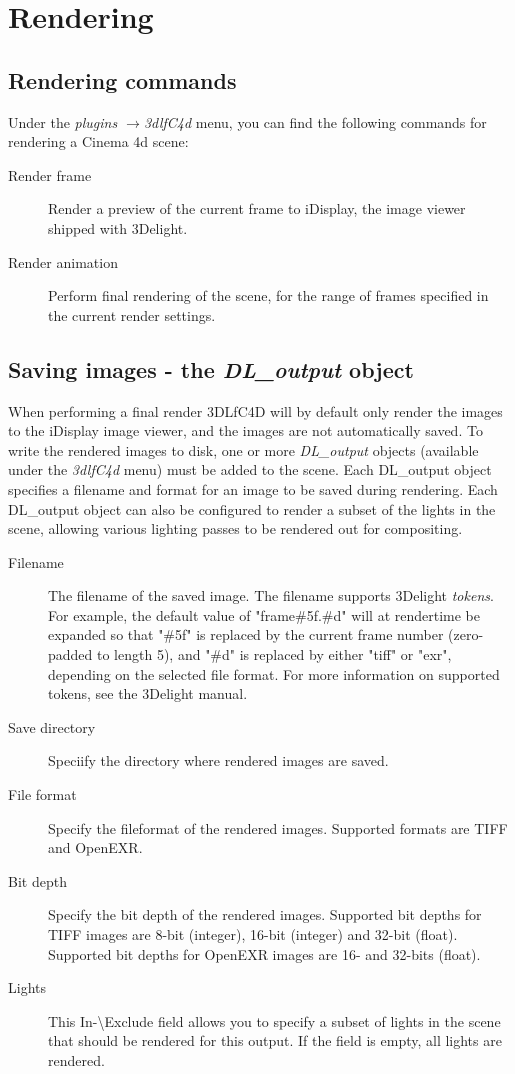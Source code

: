 \documentclass{book}
\begin{document}
\chapter{Rendering}
\section{Rendering commands}
Under the \emph{plugins $\rightarrow$3dlfC4d} menu, you can find the following commands for rendering a Cinema 4d scene:

\begin{description}
\item[Render frame] Render a preview of the current frame to iDisplay, the image viewer shipped with 3Delight. 
\item[Render animation] Perform final rendering of the scene, for the range of frames specified in the current render settings. 
\end{description}

\section{Saving images - the \emph{DL\_output} object}
When performing a final render 3DLfC4D will by default only render the images to the iDisplay image viewer, and the images are not automatically saved. To write the rendered images to disk, one or more \emph{ DL\_output } objects (available under the \emph{3dlfC4d} menu) must be added to the scene. Each DL\_output object specifies a filename and format for an image to be saved during rendering. Each DL\_output object can also be configured to render a subset of the lights in the scene, allowing various lighting passes to be rendered out for compositing. 

\begin{description}
\item[Filename] The filename of the saved image. The filename supports 3Delight \emph{tokens}. For example, the default value of "frame\#5f.\#d" will at rendertime be expanded so that "\#5f" is replaced by the current frame number (zero-padded to length 5), and "\#d" is replaced by either "tiff" or "exr", depending on the selected file format. For more information on supported tokens, see the 3Delight manual. 
\item[Save directory] Speciify the directory where rendered images are saved.
\item[File format] Specify the fileformat of the rendered images. Supported formats are TIFF and OpenEXR. 
\item[Bit depth] Specify the bit depth of the rendered images. Supported bit depths for TIFF images are 8-bit (integer), 16-bit (integer) and 32-bit (float). Supported bit depths for OpenEXR images are 16- and 32-bits (float). 
\item[Lights] This In-{\textbackslash}Exclude field allows you to specify a subset of lights in the scene that should be rendered for this output. If the field is empty, all lights are rendered.

\end{description}
\end{document}
